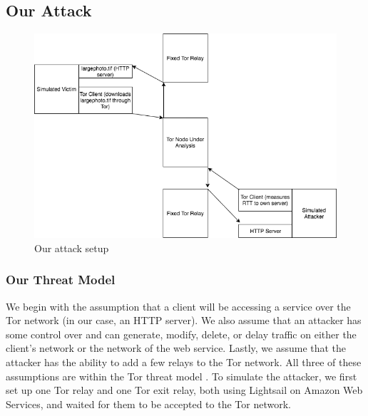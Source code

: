 \documentclass[12pt,journal]{IEEEtran}
\begin{document}
\subsection{Our Attack}
\begin{figure}
 \center
  \includegraphics[width=\textwidth]{figures/oursetup.png}
  \caption{Our attack setup}
  \label{oursetup}
\end{figure}
\subsubsection{Our Threat Model}
We begin with the assumption that a client will be accessing a service over the Tor network (in our case, an HTTP server). We also assume that an attacker has some control over and can generate, modify, delete, or delay traffic on either the client's network or the network of the web service. Lastly, we assume that the attacker has the ability to add a few relays to the Tor network. All three of these assumptions are within the Tor threat model \cite{Dingledine:2004:TSO:1251375.1251396}.
To simulate the attacker, we first set up one Tor relay and one Tor exit relay, both using Lightsail on Amazon Web Services, and waited for them to be accepted to the Tor network.
\end{document}
